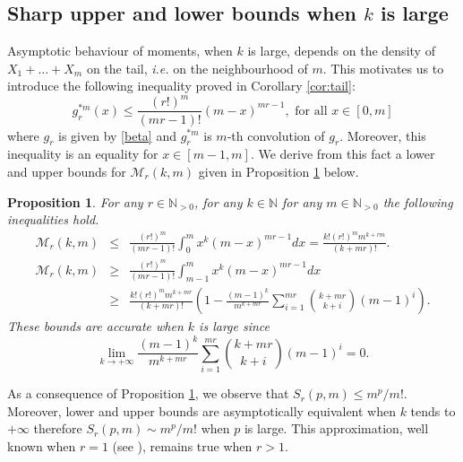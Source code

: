 \documentclass{article}
\theoremstyle{plain}
\newtheorem{proposition}[theorem]{Proposition}
\newcommand{\N}{{\mathbb N}}
\newcommand{\V}{{\mathcal M}}
\begin{document}
\subsection{Sharp upper and lower bounds when $k$ is large}

Asymptotic behaviour of moments, when $k$ is large, depends on the density of $X_1+\dots+X_m$ on the tail, \emph{i.e.} on the neighbourhood of $m$. This motivates us to introduce the following inequality proved in  Corollary \ref{cor:tail}: 
\begin{equation}
g_r^{*m}(x)\le \frac{(r!)^m}{(mr-1)!}(m-x)^{mr-1}, \text{ for all }x\in [0,m]
\end{equation} 
where $g_r$ is given by \eqref{beta} and $g_r^{*m}$ is $m$-th convolution of $g_r$. Moreover, this inequality is an equality for $x\in [m-1,m]$. We derive from this fact a lower and upper bounds for $\V_r(k,m)$ given in Proposition \ref{prop:asym} below. 

\begin{proposition}\label{prop:asym}
For any $r\in \N_{>0}$, for any $k\in \N$ for any $m\in \N_{>0}$
the following inequalities hold.
\begin{eqnarray*}
 \V_{r}(k,m) &\le&  \frac{(r!)^m}{(mr-1)!}\int_{0}^{m}x^{k}(m-x)^{mr-1}dx = \frac{k!(r!)^m m^{k+rm}}{(k+mr)!}.\\
\V_{r}(k,m) &\ge& \frac{(r!)^m}{(mr-1)!}\int_{m-1}^{m}x^{k}(m-x)^{mr-1}dx\\ 
 &\ge & \frac{k!(r!)^m m^{k+mr} }{(k+mr)!}\left(1 - \frac{(m-1)^k}{m^{k+mr}}\sum_{i=1}^{mr} \binom{k+mr}{k+i}(m-1)^{i} \right).
\end{eqnarray*}
These bounds are accurate when $k$ is large since $$\lim_{k\to+\infty} \frac{(m-1)^k}{m^{k+mr}}\sum_{i=1}^{mr} \binom{k+mr}{k+i}(m-1)^{i}=0.$$
\end{proposition}

As a consequence of Proposition \ref{prop:asym}, we observe that $S_{r}(p,m)\le m^p/m!$. Moreover, lower and upper bounds are asymptotically equivalent when $k$ tends to $+\infty$ therefore $S_r(p,m)\sim m^{p}/m!$ when $p$ is large. This approximation, well known when $r=1$ (see \cite{asym}), remains true when $r>1$. 
\end{document}
